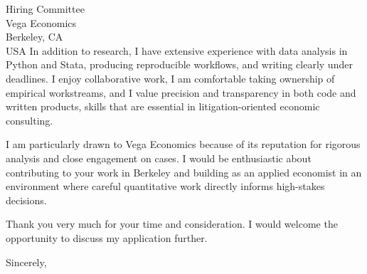 \documentclass[11pt,letterpaper]{letter}
\begin{document}
\begin{letter}{Hiring Committee \\
Vega Economics \\
Berkeley, CA \\ USA}
In addition to research, I have extensive experience with data analysis in Python and Stata, producing reproducible workflows, and writing clearly under deadlines. I enjoy collaborative work, I am comfortable taking ownership of empirical workstreams, and I value precision and transparency in both code and written products, skills that are essential in litigation-oriented economic consulting.

I am particularly drawn to Vega Economics because of its reputation for rigorous analysis and close engagement on cases. I would be enthusiastic about contributing to your work in Berkeley and building as an applied economist in an environment where careful quantitative work directly informs high-stakes decisions.

Thank you very much for your time and consideration. I would welcome the opportunity to discuss my application further.

\closing{Sincerely,}

\end{letter}
\end{document}
